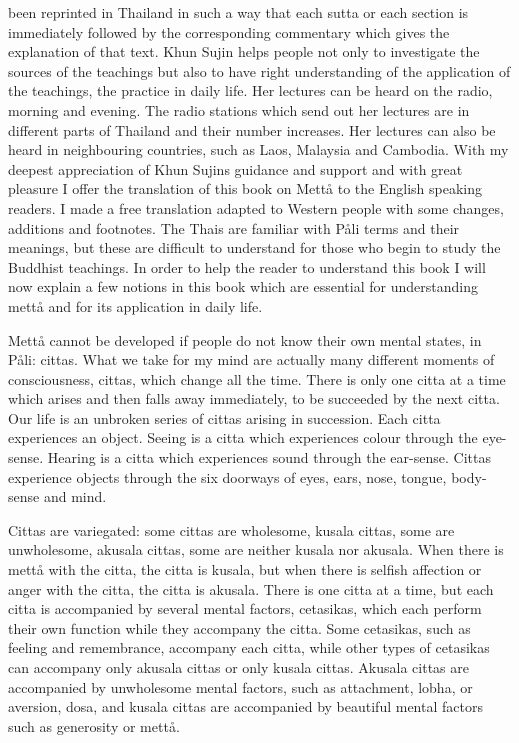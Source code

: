 \documentclass[12pt,twoside]{article}
\begin{document}
been reprinted in Thailand in such a way that each sutta or each
section is immediately followed by the corresponding commentary which
gives the explanation of that text. Khun Sujin helps people not only to
investigate the sources of the teachings but also to have right
understanding of the application of the teachings, the practice in
daily life. Her lectures can be heard on the radio, morning and
evening. The radio stations which send out her lectures are in
different parts of Thailand and their number increases. Her lectures
can also be heard in neighbouring countries, such as Laos, Malaysia and
Cambodia. With my deepest appreciation of Khun Sujin{\textquotesingle}s
guidance and support and with great pleasure I offer the translation of
this book on Mett{\aa} to the English speaking readers. I made a free
translation adapted to {\textasciigrave}{\textasciigrave}Western
people{\textquotesingle}{\textquotesingle} with some changes, additions
and footnotes. The Thais are familiar with P{\aa}li terms and their
meanings, but these are difficult to understand for those who begin to
study the Buddhist teachings. In order to help the reader to understand
this book I will now explain a few notions in this book which are
essential for understanding mett{\aa} and for its application in daily
life. 

Mett{\aa} cannot be developed if people do not know their own
{\textasciigrave}{\textasciigrave}mental
states{\textquotesingle}{\textquotesingle}, in P{\aa}li: cittas. What
we take for {\textasciigrave}{\textasciigrave}my
mind{\textquotesingle}{\textquotesingle} are actually many different
moments of consciousness, cittas, which change all the time. There is
only one citta at a time which arises and then falls away immediately,
to be succeeded by the next citta. Our life is an unbroken series of
cittas arising in succession. Each citta experiences an object. Seeing
is a citta which experiences colour through the eye{}-sense. Hearing is
a citta which experiences sound through the ear{}-sense. Cittas
experience objects through the six doorways of eyes, ears, nose,
tongue, body{}-sense and mind. 

Cittas are variegated: some cittas are wholesome, kusala cittas, some
are unwholesome, akusala cittas, some are neither kusala nor akusala.
When there is mett{\aa} with the citta, the citta is kusala, but when
there is selfish affection or anger with the citta, the citta is
akusala. There is one citta at a time, but each citta is accompanied by
several mental factors, cetasikas, which each perform their own
function while they accompany the citta. Some cetasikas, such as
feeling and remembrance, accompany each citta, while other types of
cetasikas can accompany only akusala cittas or only kusala cittas.
Akusala cittas are accompanied by unwholesome mental factors, such as
attachment, lobha, or aversion, dosa, and kusala cittas are accompanied
by {\textasciigrave}{\textasciigrave}beautiful mental
factors{\textquotesingle}{\textquotesingle} such as generosity or
mett{\aa}. 
\end{document}
